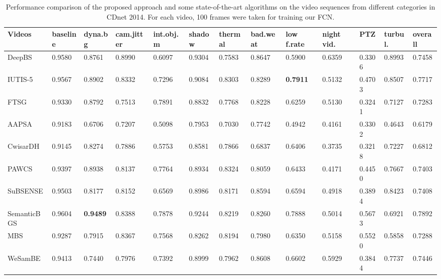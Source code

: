 \documentclass[journal]{IEEEtran}
\begin{document}
\begin{table}[!t]				%
\centering
\caption{Performance comparison of the proposed approach and some state-of-the-art algorithms on the video sequences from different categories in CDnet 2014. For each video, 100 frames were taken for training our FCN.}
\label{tab1}
\begin{tabular}{lllllllllllll}
\hline
Videos      & baseline & dyna.bg & cam.jitter & int.obj.m & shadow & thermal & bad.weat & low f.rate & night vid. & PTZ    & turbul. & overall \\ \hline
DeepBS\cite{Babaee2017deep}      & 0.9580   & 0.8761  & 0.8990     & 0.6097    & 0.9304 & 0.7583  & 0.8647   & 0.5900     & 0.6359     & 0.3306 & 0.8993  & 0.7458  \\
IUTIS-5\cite{Bianco2017TEC}     & 0.9567   & 0.8902  & 0.8332     & 0.7296    & 0.9084 & 0.8303  & 0.8289   & \textbf{0.7911}     & 0.5132     & 0.4703 & 0.8507  & 0.7717  \\
FTSG\cite{Wang2014FTSG}        & 0.9330   & 0.8792  & 0.7513     & 0.7891    & 0.8832 & 0.7768  & 0.8228   & 0.6259     & 0.5130     & 0.3241 & 0.7127  & 0.7283  \\
AAPSA\cite{RAMIREZALONSO2016990}       & 0.9183   & 0.6706  & 0.7207     & 0.5098    & 0.7953 & 0.7030  & 0.7742   & 0.4942     & 0.4161     & 0.3302 & 0.4643  & 0.6179  \\
CwisarDH\cite{Gregorio2014CwisarDH}    & 0.9145   & 0.8274  & 0.7886     & 0.5753    & 0.8581 & 0.7866  & 0.6837   & 0.6406     & 0.3735     & 0.3218 & 0.7227  & 0.6812  \\
PAWCS\cite{Charles2015PAWCS}       & 0.9397   & 0.8938  & 0.8137     & 0.7764    & 0.8934 & 0.8324  & 0.8059   & 0.6433     & 0.4171     & 0.4450 & 0.7667  & 0.7403  \\
SuBSENSE\cite{St-Charles2015SuBSENSE}    & 0.9503   & 0.8177  & 0.8152     & 0.6569    & 0.8986 & 0.8171  & 0.8594   & 0.6594     & 0.4918     & 0.3894 & 0.8423  & 0.7408  \\
SemanticBGS\cite{Braham2017Semantic} & 0.9604   & \textbf{0.9489}  & 0.8388     & 0.7878    & 0.9244 & 0.8219  & 0.8260   & 0.7888     & 0.5014     & 0.5673 & 0.6921  & 0.7892  \\
MBS\cite{Multimode_Background_Subtraction}         & 0.9287   & 0.7915  & 0.8367     & 0.7568    & 0.8262 & 0.8194  & 0.7980   & 0.6350     & 0.5158     & 0.5520 & 0.5858  & 0.7288  \\
WeSamBE\cite{2017_TCSVT_BG_7938679}     & 0.9413   & 0.7440  & 0.7976     & 0.7392    & 0.8999 & 0.7962  & 0.8608   & 0.6602     & 0.5929     & 0.3844 & 0.7737  & 0.7446  \\

\end{tabular}
\end{table}
\end{document}
